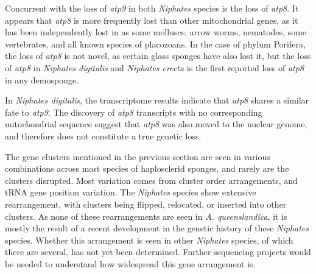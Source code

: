 \documentclass[../main.tex]{subfiles}
\begin{document}
Concurrent with the loss of \emph{atp9} in both \emph{Niphates} species is the loss of \emph{atp8}. It appears that \emph{atp8} is more frequently lost than other mitochondrial genes, as it has been independently lost in as some molluscs, arrow worms, nematodes, some vertebrates, and all known species of placozoans. In the case of phylum Porifera, the loss of \emph{atp8} is not novel, as certain glass sponges have also lost it, but the loss of \emph{atp8} in \emph{Niphates digitalis} and \emph{Niphates erecta} is the first reported loss of \emph{atp8} in any demosponge. 

In \emph{Niphates digitalis}, the transcriptome results indicate that \emph{atp8} shares a similar fate to \emph{atp9}. The discovery of \emph{atp8} transcripts with no corresponding mitochondrial sequence suggest that \emph{atp8} was also moved to the nuclear genome, and therefore does not constitute a true genetic loss. 

The gene clusters mentioned in the previous section are seen in various combinations across most species of haplosclerid sponges, and rarely are the clusters disrupted. Most variation comes from cluster order arrangements, and tRNA gene position variation. The \emph{Niphates} species show extensive rearrangement, with clusters being flipped, relocated, or inserted into other clusters. As none of these rearrangements are seen in \emph{A. queenslandica}, it is mostly the result of a recent development in the genetic history of these \emph{Niphates} species. Whether this arrangement is seen in other \emph{Niphates} species, of which there are several, has not yet been determined. Further sequencing projects would be needed to understand how widespread this gene arrangement is. 
\end{document}
